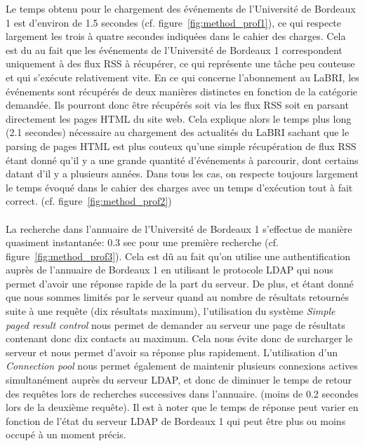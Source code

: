 Le temps obtenu pour le chargement des événements de l'Université de Bordeaux 1 est d'environ de 1.5 secondes (cf. figure~\ref{fig:method_prof1}), ce qui respecte largement les trois à quatre secondes indiquées dans le cahier des charges. Cela est du au fait que les événements de l'Université de Bordeaux 1 correspondent uniquement à des flux RSS à récupérer, ce qui représente une tâche peu couteuse et qui s'exécute relativement vite.
En ce qui concerne l'abonnement au LaBRI, les événements sont récupérés de deux manières distinctes en fonction de la catégorie demandée. Ils pourront donc être récupérés soit via les flux RSS soit en parsant directement les pages HTML du site web. Cela explique alors le temps plus long (2.1 secondes) nécessaire au chargement des actualités du LaBRI sachant que le parsing de pages HTML est plus couteux qu'une simple récupération de flux RSS étant donné qu'il y a une grande quantité d'événements à parcourir, dont certains datant d'il y a plusieurs années. Dans tous les cas, on respecte toujours largement le temps évoqué dans le cahier des charges avec un temps d'exécution tout à fait correct. (cf. figure~\ref{fig:method_prof2})\\\\
 

La recherche dans l'annuaire de l'Université de Bordeaux 1 s'effectue de manière quasiment instantanée: 0.3 sec pour une première recherche (cf. figure~\ref{fig:method_prof3}). Cela est dû au fait qu'on utilise une authentification auprès de l'annuaire de Bordeaux 1 en utilisant le protocole LDAP qui nous permet d'avoir une réponse rapide de la part du serveur. De plus, et étant donné que nous sommes limités par le serveur quand au nombre de résultats retournés suite à une requête (dix résultats maximum), l'utilisation du système \emph{Simple paged result control} nous permet de demander au serveur une page de résultats contenant donc dix contacts au maximum. Cela nous évite donc de surcharger le serveur et nous permet d'avoir sa réponse plus rapidement. L'utilisation d'un \emph{Connection pool} nous permet également de maintenir plusieurs connexions actives simultanément auprès du serveur LDAP, et donc de diminuer le temps de retour des requêtes lors de recherches successives dans l'annuaire. (moins de 0.2 secondes lors de la deuxième requête). Il est à noter que le temps de réponse peut varier en fonction de l'état du serveur LDAP de Bordeaux 1 qui peut être plus ou moins occupé à un moment précis.\\\\

